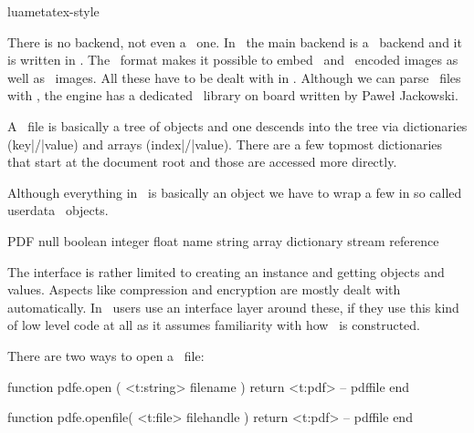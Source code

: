 
\environment luametatex-style

\startdocument[title=PDF]

\startsection[title={Introduction}]

There is no backend, not even a \DVI\ one. In \CONTEXT\ the main backend is a
\PDF\ backend and it is written in \LUA. The \PDF\ format makes it possible to
embed \JPEG\ and \PNG\ encoded images as well as \PDF\ images. All these have to
be dealt with in \LUA. Although we can parse \PDF\ files with \LUA, the engine
has a dedicated \PDF\ library on board written by Paweł Jackowski.

A \PDF\ file is basically a tree of objects and one descends into the tree via
dictionaries (key|/|value) and arrays (index|/|value). There are a few topmost
dictionaries that start at the document root and those are accessed more
directly.

Although everything in \PDF\ is basically an object we have to wrap a few in so
called userdata \LUA\ objects.

\starttabulate[|l|l|]
\FL
\BC PDF        \BC \LUA         \NC \NR
\TL
\NC null             \NC \NR
\NC boolean      \NC \NR
\NC integer      \NC \NR
\NC float         \NC \NR
\NC name          \NC \NR
\NC string        \NC \NR
\NC array       \NC \NR
\NC dictionary  \NC \NR
\NC stream      \NC \NR
\NC reference   \NC \NR
\LL
\stoptabulate

The interface is rather limited to creating an instance and getting objects and
values. Aspects like compression and encryption are mostly dealt with
automatically. In \CONTEXT\ users use an interface layer around these, if they
use this kind of low level code at all as it assumes familiarity with how \PDF\
is constructed.

\stopsection

\startsection[title={\LUA\ interfaces}]

\startsubsection[title={Opening and closing}]

There are two ways to open a \PDF\ file:

\starttyping[option=LUA]
function pdfe.open ( <t:string> filename )
    return <t:pdf>  -- pdffile
end

function pdfe.openfile( <t:file> filehandle )
    return <t:pdf> -- pdffile
end
\stoptyping


